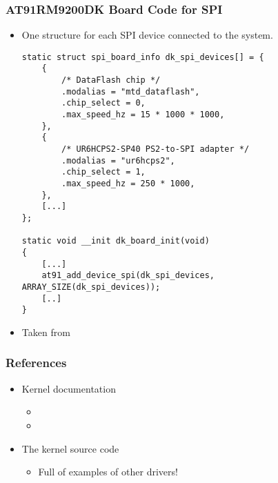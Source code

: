 \begin{frame}[fragile]
  \frametitle{AT91RM9200DK Board Code for SPI}
  \begin{itemize}
  \item One  structure for each SPI device
    connected to the system.
  \begin{verbatim}
static struct spi_board_info dk_spi_devices[] = {
    {
        /* DataFlash chip */
        .modalias = "mtd_dataflash",
        .chip_select = 0,
        .max_speed_hz = 15 * 1000 * 1000,
    },
    {
        /* UR6HCPS2-SP40 PS2-to-SPI adapter */
        .modalias = "ur6hcps2",
        .chip_select = 1,
        .max_speed_hz = 250 * 1000,
    },
    [...]
};

static void __init dk_board_init(void)
{
    [...]
    at91_add_device_spi(dk_spi_devices, ARRAY_SIZE(dk_spi_devices));
    [..]
}
  \end{verbatim}
  \item Taken from 
  \end{itemize}
\end{frame}

\begin{frame}
  \frametitle{References}
  \begin{itemize}
  \item Kernel documentation
    \begin{itemize}
    \item {}
    \item {}
    \end{itemize}
  \item The kernel source code
    \begin{itemize}
    \item Full of examples of other drivers!
    \end{itemize}
  \end{itemize}
\end{frame}

